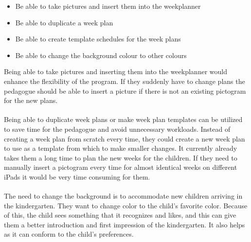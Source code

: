 \begin{itemize}
    \item Be able to take pictures and insert them into the weekplanner
    \item Be able to duplicate a week plan
    \item Be able to create template schedules for the week plans
    \item Be able to change the background colour to other colours
\end{itemize}
\noindent
Being able to take pictures and inserting them into the weekplanner would enhance the flexibility of the program.
If they suddenly have to change plans the pedagogue should be able to insert a picture if there is not an existing pictogram for the new plans.
\\\\
Being able to duplicate week plans or make week plan templates can be utilized to save time for the pedagogue and avoid unnecessary workloads.
Instead of creating a week plan from scratch every time, they could create a new week plan to use as a template from which to make smaller changes. 
It currently already takes them a long time to plan the new weeks for the children. 
If they need to manually insert a pictogram every time for almost identical weeks on different iPads it would be very time consuming for them.
\\\\
The need to change the background is to accommodate new children arriving in the kindergarten. 
They want to change color to the child's favorite color. 
Because of this, the child sees something that it recognizes and likes, and this can give them a better introduction and first impression of the kindergarten.
It also helps as it can conform to the child's preferences.
